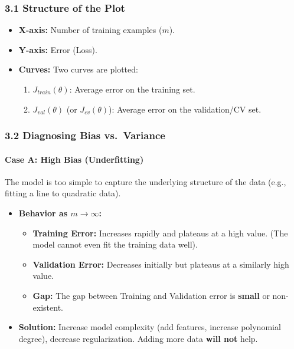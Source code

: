 \documentclass[
  italian,
  11pt,
]{article}
\begin{document}
\subsubsection{3.1 Structure of the Plot}\label{structure-of-the-plot}

\begin{itemize}
\item
  \textbf{X-axis:} Number of training examples (\(m\)).
\item
  \textbf{Y-axis:} Error (Loss).
\item
  \textbf{Curves:} Two curves are plotted:

  \begin{enumerate}
  \def\labelenumi{\arabic{enumi}.}
  \item
    \(J_{train}(\theta)\): Average error on the training set.
  \item
    \(J_{val}(\theta)\) (or \(J_{cv}(\theta)\)): Average error on the
    validation/CV set.
  \end{enumerate}
\end{itemize}

\subsubsection{3.2 Diagnosing Bias
vs.~Variance}\label{diagnosing-bias-vs.-variance}

\paragraph{Case A: High Bias
(Underfitting)}\label{case-a-high-bias-underfitting}

The model is too simple to capture the underlying structure of the data
(e.g., fitting a line to quadratic data).

\begin{itemize}
\item
  \textbf{Behavior as \(m \to \infty\):}

  \begin{itemize}
  \item
    \textbf{Training Error:} Increases rapidly and plateaus at a high
    value. (The model cannot even fit the training data well).
  \item
    \textbf{Validation Error:} Decreases initially but plateaus at a
    similarly high value.
  \item
    \textbf{Gap:} The gap between Training and Validation error is
    \textbf{small} or non-existent.
  \end{itemize}
\item
  \textbf{Solution:} Increase model complexity (add features, increase
  polynomial degree), decrease regularization. Adding more data
  \textbf{will not} help.
\end{itemize}
\end{document}
